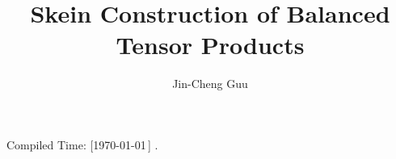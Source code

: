 \title{Skein Construction of Balanced Tensor Products}
\author{Jin-Cheng Guu}
\date{}



\maketitle
\begin{flushright}
  \tiny{Compiled Time: [\today\,\DTMcurrenttime]} \quad\qquad.
\end{flushright}


\tableofcontents

